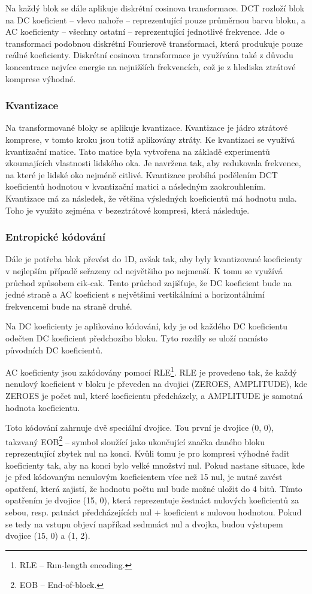 Na každý blok se dále aplikuje diskrétní cosinova transformace.
DCT rozloží blok na DC koeficient -- vlevo nahoře -- reprezentující pouze průměrnou barvu bloku, a AC koeficienty -- všechny ostatní -- reprezentující jednotlivé frekvence.
Jde o transformaci podobnou diskrétní Fourierově transformaci, která produkuje pouze reálné koeficienty.
Diskrétní cosinova transformace je využívána také z důvodu koncentrace nejvíce energie na nejnižších frekvencích, což je z hlediska ztrátové komprese výhodné.

\subsubsection*{Kvantizace}

Na transformované bloky se aplikuje kvantizace.
Kvantizace je jádro ztrátové komprese, v tomto kroku jsou totiž aplikovány ztráty.
Ke kvantizaci se využívá kvantizační matice.
Tato matice byla vytvořena na základě experimentů zkoumajících vlastnosti lidského oka.
Je navržena tak, aby redukovala frekvence, na které je lidské oko nejméně citlivé.
Kvantizace probíhá podělením DCT koeficientů hodnotou v kvantizační matici a následným zaokrouhlením.
Kvantizace má za následek, že většina výsledných koeficientů má hodnotu nula.
Toho je využito zejména v bezeztrátové kompresi, která následuje.

\subsubsection*{Entropické kódování}

Dále je potřeba blok převést do 1D, avšak tak, aby byly kvantizované koeficienty v nejlepším případě seřazeny od největšiho po nejmenší.
K tomu se využívá průchod způsobem cik-cak.
Tento průchod zajišťuje, že DC koeficient bude na jedné straně a AC koeficient s největšimi vertikálními a horizontálnímí frekvencemi bude na straně druhé.

Na DC koeficienty je aplikováno kódování, kdy je od každého DC koeficientu odečten DC koeficient předchozího bloku.
Tyto rozdíly se uloží namísto původních DC koeficientů.

AC koeficienty jsou zakódovány pomocí RLE\footnote{RLE -- Run-length encoding.}.
RLE je provedeno tak, že každý nenulový koeficient v bloku je převeden na dvojici (ZEROES, AMPLITUDE), kde ZEROES je počet nul, které koeficientu předcházely, a AMPLITUDE je samotná hodnota koeficientu.

Toto kódování zahrnuje dvě speciální dvojice.
Tou první je dvojice (0, 0), takzvaný EOB\footnote{EOB -- End-of-block.} -- symbol sloužící jako ukončující značka daného bloku reprezentující zbytek nul na konci.
Kvůli tomu je pro kompresi výhodné řadit koeficienty tak, aby na konci bylo velké množství nul.
Pokud nastane situace, kde je před kódovaným nenulovým koeficientem více než 15 nul, je nutné zavést opatření, která zajistí, že hodnotu počtu nul bude možné uložit do 4 bitů.
Tímto opatřením je dvojice (15, 0), která reprezentuje šestnáct nulových koeficientů za sebou, resp. patnáct předcházejících nul + koeficient s nulovou hodnotou.
Pokud se tedy na vstupu objeví napříkad sedmnáct nul a dvojka, budou výstupem dvojice (15, 0) a (1, 2).

